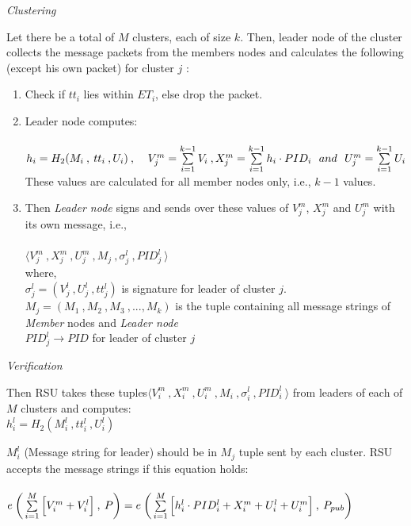 \documentclass[10pt,journal,letterpaper]{IEEEtran}
\begin{document}
\begin{center}
    \emph{Clustering}
\end{center}
Let there be a total of $M$ clusters, each of size $k$. Then, leader
node of the cluster collects the message packets from the members
nodes and calculates the following (except his own packet) for
cluster $j$ :
\begin{enumerate}
    \item Check if $tt_i$ lies within $ET_i$, else drop the packet.
    \item Leader node computes:\\ \\
    $ h_i = H_2(M_i \: , \: tt_i \:, U_i) \:,\: \:  \: \: \: V^m_j = \sum\limits_{i=1}^{k-1} V_i \:, \\
    X^m_j = \sum\limits_{i=1}^{k-1} h_i \cdot PID_i \:
     \: \: and \: \: \:
     U^m_j = \sum\limits_{i=1}^{k-1} U_i $\\
     These values are calculated for all member nodes only, i.e., $k-1$ values.
    \item Then \emph{Leader node} signs and sends over these values of $V^m_j$, $X^m_j$ and $U^m_j$ with its own message, i.e., \\ \\ $\big \langle V^m_j \:, X^m_j \:, U^m_j \:, M_j \:, \sigma^l_j \:, PID^l_j \: \big \rangle$ \\
    where,\\
    $\sigma^l_j = (V^l_j \:, U^l_j \:, tt^l_j)$ is signature for leader of cluster $j$.
    $M_j = (M_1 \:, M_2 \:, M_3 \:, ... , M_{k})$ is the tuple containing all message strings of \emph{Member} nodes and \emph{Leader node} \\
    $PID^l_j \rightarrow PID$ for leader of cluster $j$ \\


\end{enumerate}

\begin{center}
    \emph{Verification}
\end{center}

Then RSU takes these tuples$\big \langle V^m_i \:, X^m_i \:, U^m_i \:, M_i \:, \sigma^l_i \:, PID^l_i \: \big \rangle$ from leaders of each of $M$ clusters and computes: \\
$h_i^l = H_2(M_i^l \: ,  tt_i^l \:, U_i^l)$

$M_i^l$ (Message string for leader) should be in $M_j$ tuple sent by
each cluster.
RSU accepts the message strings if this equation holds:\\ \\
$e\: \bigg( \sum\limits_{i=1}^{M} \Big[ V_i^m + V^l_i \Big] \:,\:P \bigg) \\
= e\: \bigg( \sum\limits_{i=1}^{M} \Big[ h_i^l\cdot PID_i^l + X^m_i
+ U_i^l + U^m_i\Big] \:,\:P_{pub} \bigg)  $
\end{document}
